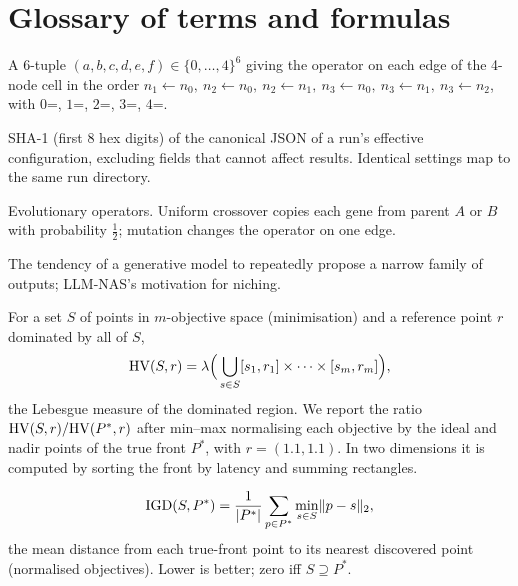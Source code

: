 \appendix
\section{Glossary of terms and formulas}\label{sec:glossary}
\begin{description}[style=nextline,leftmargin=0pt,itemsep=3pt]

\item[Architecture code (NB201).] A 6-tuple $(a,b,c,d,e,f)\in\{0,\dots,4\}^6$ giving the operator on each edge of the 4-node cell in the order $n_1{\leftarrow}n_0,\ n_2{\leftarrow}n_0,\ n_2{\leftarrow}n_1,\ n_3{\leftarrow}n_0,\ n_3{\leftarrow}n_1,\ n_3{\leftarrow}n_2$, with $0$=, $1$=, $2$=, $3$=, $4$=.

\item[Configuration hash.] SHA-1 (first 8 hex digits) of the canonical JSON of a run's effective configuration, excluding fields that cannot affect results. Identical settings map to the same run directory.

\item[Crossover / mutation.] Evolutionary operators. Uniform crossover copies each gene from parent $A$ or $B$ with probability $\tfrac12$; mutation changes the operator on one edge.

\item[Exploration bias / mode collapse.] The tendency of a generative model to repeatedly propose a narrow family of outputs; LLM-NAS's motivation for niching.

\item[Hypervolume (HV).] For a set $S$ of points in $m$-objective space (minimisation) and a reference point $r$ dominated by all of $S$,
\[
\mathrm{HV}(S,r)=\lambda\Big(\bigcup_{s\in S}[s_1,r_1]\times\cdots\times[s_m,r_m]\Big),
\]
the Lebesgue measure of the dominated region. We report the ratio $\mathrm{HV}(S,r)/\mathrm{HV}(P^\ast,r)$ after min--max normalising each objective by the ideal and nadir points of the true front $P^\ast$, with $r=(1.1,1.1)$. In two dimensions it is computed by sorting the front by latency and summing rectangles.

\item[Inverted generational distance (IGD).]
\[
\mathrm{IGD}(S,P^\ast)=\frac{1}{|P^\ast|}\sum_{p\in P^\ast}\min_{s\in S}\lVert p-s\rVert_2,
\]
the mean distance from each true-front point to its nearest discovered point (normalised objectives). Lower is better; zero iff $S\supseteq P^\ast$.


\end{description}
